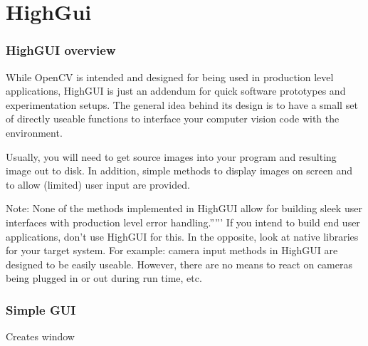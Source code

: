 \chapter{HighGui}

\subsection{HighGUI overview}

While OpenCV is intended and designed for being used in production level
applications, HighGUI is just an addendum for quick software prototypes
and experimentation setups. The general idea behind its design is to
have a small set of directly useable functions to interface your computer
vision code with the environment.

Usually, you will need to get source images into your program and
resulting image out to disk. In addition, simple methods to display
images on screen and to allow (limited) user input are provided.

Note: None of the methods implemented in HighGUI allow for building
sleek user interfaces with production level error handling.''''' If you
intend to build end user applications, don't use HighGUI for this. In
the opposite, look at native libraries for your target system. For
example: camera input methods in HighGUI are designed to be easily
useable. However, there are no means to react on cameras being plugged
in or out during run time, etc.

\subsection{Simple GUI}


Creates window


\begin{description}
\end{description}

